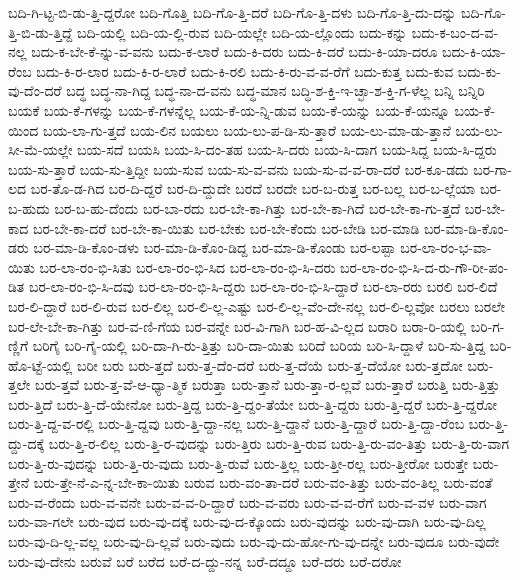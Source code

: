 {ಬದಿ-ಗಿ-ಟ್ಟ-ಬಿ-ಡು-ತ್ತಿ-ದ್ದರೋ
ಬದಿ-ಗೊತ್ತಿ
ಬದಿ-ಗೊ-ತ್ತಿ-ದರೆ
ಬದಿ-ಗೊ-ತ್ತಿ-ದಳು
ಬದಿ-ಗೊ-ತ್ತಿ-ದು-ದನ್ನು
ಬದಿ-ಗೊ-ತ್ತಿ-ಬಿ-ಡು-ತ್ತಿದ್ದೆ
ಬದಿ-ಯಲ್ಲಿ
ಬದಿ-ಯ-ಲ್ಲಿ-ರುವ
ಬದಿ-ಯಲ್ಲೇ
ಬದಿ-ಯ-ಲ್ಲೊಂದು
ಬದು-ಕನ್ನು
ಬದು-ಕ-ಬಂ-ದ-ವ-ನಲ್ಲ
ಬದು-ಕ-ಬೇ-ಕೆ-ನ್ನು-ವ-ವನು
ಬದು-ಕ-ಲಾರೆ
ಬದು-ಕಿ-ದರು
ಬದು-ಕಿ-ದರೆ
ಬದು-ಕಿ-ಯಾ-ದರೂ
ಬದು-ಕಿ-ಯಾ-ರೆಂಬ
ಬದು-ಕಿ-ರ-ಲಾರ
ಬದು-ಕಿ-ರ-ಲಾರೆ
ಬದು-ಕಿ-ರಲಿ
ಬದು-ಕಿ-ರು-ವ-ವ-ರೆಗೆ
ಬದು-ಕುತ್ತ
ಬದು-ಕುವ
ಬದು-ಕು-ವು-ದೆಂ-ದರೆ
ಬದ್ಧ
ಬದ್ಧ-ನಾ-ಗಿದ್ದ
ಬದ್ಧ-ನಾ-ದ-ವನು
ಬದ್ಧ-ಮಾನ
ಬದ್ಧಿ-ಶ-ಕ್ತಿ-ಇ-ಚ್ಛಾ-ಶ-ಕ್ತಿ-ಗ-ಳೆಲ್ಲ
ಬನ್ನಿ
ಬನ್ನಿರಿ
ಬಯಕೆ
ಬಯ-ಕೆ-ಗಳನ್ನು
ಬಯ-ಕೆ-ಗಳನ್ನೆಲ್ಲ
ಬಯ-ಕೆ-ಯ-ನ್ನಿ-ಡುವ
ಬಯ-ಕೆ-ಯನ್ನು
ಬಯ-ಕೆ-ಯನ್ನೂ
ಬಯ-ಕೆ-ಯಿಂದ
ಬಯ-ಲಾ-ಗು-ತ್ತದೆ
ಬಯ-ಲಿನ
ಬಯಲು
ಬಯ-ಲು-ಪ-ಡಿ-ಸು-ತ್ತಾರೆ
ಬಯ-ಲು-ಮಾ-ಡು-ತ್ತಾನೆ
ಬಯ-ಲು-ಸೀ-ಮೆ-ಯಲ್ಲೇ
ಬಯ-ಸದೆ
ಬಯಸಿ
ಬಯ-ಸಿ-ದಂ-ತಹ
ಬಯ-ಸಿ-ದರು
ಬಯ-ಸಿ-ದಾಗ
ಬಯ-ಸಿದ್ದ
ಬಯ-ಸಿ-ದ್ದರು
ಬಯ-ಸು-ತ್ತಾರೆ
ಬಯ-ಸು-ತ್ತಿದ್ದೀ
ಬಯ-ಸುವ
ಬಯ-ಸು-ವ-ವನು
ಬಯ-ಸು-ವ-ವ-ರಾ-ದರೆ
ಬರ-ಕೂ-ಡದು
ಬರ-ಗಾ-ಲದ
ಬರ-ತೊ-ಡ-ಗಿದ
ಬರ-ದಿ-ದ್ದರೆ
ಬರ-ದಿ-ದ್ದುದೇ
ಬರದೆ
ಬರದೇ
ಬರ-ಬ-ರುತ್ತ
ಬರ-ಬಲ್ಲ
ಬರ-ಬ-ಲ್ಲೆಯಾ
ಬರ-ಬ-ಹುದು
ಬರ-ಬ-ಹು-ದೆಂದು
ಬರ-ಬಾ-ರದು
ಬರ-ಬೇ-ಕಾ-ಗಿತ್ತು
ಬರ-ಬೇ-ಕಾ-ಗಿದೆ
ಬರ-ಬೇ-ಕಾ-ಗು-ತ್ತದೆ
ಬರ-ಬೇ-ಕಾದ
ಬರ-ಬೇ-ಕಾ-ದರೆ
ಬರ-ಬೇ-ಕಾ-ಯಿತು
ಬರ-ಬೇಕು
ಬರ-ಬೇ-ಕೆಂದು
ಬರ-ಬೇಡಿ
ಬರ-ಮಾಡಿ
ಬರ-ಮಾ-ಡಿ-ಕೊಂ-ಡರು
ಬರ-ಮಾ-ಡಿ-ಕೊಂ-ಡಳು
ಬರ-ಮಾ-ಡಿ-ಕೊಂ-ಡಿದ್ದ
ಬರ-ಮಾ-ಡಿ-ಕೊಂಡು
ಬರ-ಲಪ್ಪಾ
ಬರ-ಲಾ-ರಂ-ಭ-ವಾ-ಯಿತು
ಬರ-ಲಾ-ರಂ-ಭಿ-ಸಿತು
ಬರ-ಲಾ-ರಂ-ಭಿ-ಸಿದ
ಬರ-ಲಾ-ರಂ-ಭಿ-ಸಿ-ದರು
ಬರ-ಲಾ-ರಂ-ಭಿ-ಸಿ-ದ-ರು-ಗೌ-ರೀ-ಪಂ-ಡಿತ
ಬರ-ಲಾ-ರಂ-ಭಿ-ಸಿ-ದವು
ಬರ-ಲಾ-ರಂ-ಭಿ-ಸಿ-ದ್ದರು
ಬರ-ಲಾ-ರಂ-ಭಿ-ಸಿ-ದ್ದಾರೆ
ಬರ-ಲಾ-ರರು
ಬರಲಿ
ಬರ-ಲಿದೆ
ಬರ-ಲಿ-ದ್ದಾರೆ
ಬರ-ಲಿ-ರುವ
ಬರ-ಲಿಲ್ಲ
ಬರ-ಲಿ-ಲ್ಲ-ಎಷ್ಟು
ಬರ-ಲಿ-ಲ್ಲ-ವೆಂ-ದೇ-ನಲ್ಲ
ಬರ-ಲಿ-ಲ್ಲವೋ
ಬರಲು
ಬರಲೇ
ಬರ-ಲೇ-ಬೇ-ಕಾ-ಗಿತ್ತು
ಬರ-ವ-ಣಿ-ಗೆಯ
ಬರ-ವನ್ನೇ
ಬರ-ವಿ-ಗಾಗಿ
ಬರ-ಹ-ವಿ-ಲ್ಲದ
ಬರಾರಿ
ಬರಾ-ರಿ-ಯಲ್ಲಿ
ಬರಿ-ಗ-ಣ್ಣಿಗೆ
ಬರಿಗೈ
ಬರಿ-ಗೈ-ಯಲ್ಲಿ
ಬರಿ-ದಾ-ಗಿ-ರು-ತ್ತಿತ್ತು
ಬರಿ-ದಾ-ಯಿತು
ಬರಿದೆ
ಬರಿಯ
ಬರಿ-ಸಿ-ದ್ದಾಳೆ
ಬರಿ-ಸು-ತ್ತಿದ್ದ
ಬರಿ-ಹೊ-ಟ್ಟೆ-ಯಲ್ಲಿ
ಬರೀ
ಬರು
ಬರು-ತ್ತದೆ
ಬರು-ತ್ತ-ದೆಂ-ದರೆ
ಬರು-ತ್ತ-ದೆಯೆ
ಬರು-ತ್ತ-ದೆಯೋ
ಬರು-ತ್ತದೋ
ಬರು-ತ್ತಲೇ
ಬರು-ತ್ತವೆ
ಬರು-ತ್ತ-ವೆ-ಆ-ಧ್ಯಾ-ತ್ಮಿಕ
ಬರುತ್ತಾ
ಬರು-ತ್ತಾನೆ
ಬರು-ತ್ತಾ-ರ-ಲ್ಲವೆ
ಬರು-ತ್ತಾರೆ
ಬರುತ್ತಿ
ಬರು-ತ್ತಿತ್ತು
ಬರು-ತ್ತಿದೆ
ಬರು-ತ್ತಿ-ದೆ-ಯೇನೋ
ಬರು-ತ್ತಿದ್ದ
ಬರು-ತ್ತಿ-ದ್ದಂ-ತೆಯೇ
ಬರು-ತ್ತಿ-ದ್ದರು
ಬರು-ತ್ತಿ-ದ್ದರೆ
ಬರು-ತ್ತಿ-ದ್ದರೋ
ಬರು-ತ್ತಿ-ದ್ದ-ವ-ರಲ್ಲಿ
ಬರು-ತ್ತಿ-ದ್ದವು
ಬರು-ತ್ತಿ-ದ್ದಾ-ನಲ್ಲ
ಬರು-ತ್ತಿ-ದ್ದಾನೆ
ಬರು-ತ್ತಿ-ದ್ದಾರೆ
ಬರು-ತ್ತಿ-ದ್ದಾ-ರೆಂಬ
ಬರು-ತ್ತಿ-ದ್ದು-ದಕ್ಕೆ
ಬರು-ತ್ತಿ-ರ-ಲಿಲ್ಲ
ಬರು-ತ್ತಿ-ರ-ವುದನ್ನು
ಬರು-ತ್ತಿರು
ಬರು-ತ್ತಿ-ರುವ
ಬರು-ತ್ತಿ-ರು-ವಂ-ತಿತ್ತು
ಬರು-ತ್ತಿ-ರು-ವಾಗ
ಬರು-ತ್ತಿ-ರು-ವುದನ್ನು
ಬರು-ತ್ತಿ-ರು-ವುದು
ಬರು-ತ್ತಿ-ರುವೆ
ಬರು-ತ್ತಿಲ್ಲ
ಬರು-ತ್ತೀ-ರಲ್ಲ
ಬರು-ತ್ತೀರೋ
ಬರುತ್ತೇ
ಬರು-ತ್ತೇನೆ
ಬರು-ತ್ತೇ-ನೆ-ಎ-ನ್ನ-ಬೇ-ಕಾ-ಯಿತು
ಬರುವ
ಬರು-ವಂ-ತಾ-ದರೆ
ಬರು-ವಂ-ತಿತ್ತು
ಬರು-ವಂ-ತಿಲ್ಲ
ಬರು-ವಂತೆ
ಬರು-ವ-ರೆಂದು
ಬರು-ವ-ವನೇ
ಬರು-ವ-ವ-ರಿ-ದ್ದಾರೆ
ಬರು-ವ-ವರು
ಬರು-ವ-ವ-ರೆಗೆ
ಬರು-ವ-ವಳ
ಬರು-ವಾಗ
ಬರು-ವಾ-ಗಲೇ
ಬರು-ವುದ
ಬರು-ವು-ದಕ್ಕೆ
ಬರು-ವು-ದ-ಕ್ಕೊಂದು
ಬರು-ವುದನ್ನು
ಬರು-ವು-ದಾಗಿ
ಬರು-ವು-ದಿಲ್ಲ
ಬರು-ವು-ದಿ-ಲ್ಲ-ವಲ್ಲ
ಬರು-ವು-ದಿ-ಲ್ಲವೆ
ಬರು-ವುದು
ಬರು-ವು-ದು-ಹೋ-ಗು-ವು-ದನ್ನೇ
ಬರು-ವುದೂ
ಬರು-ವುದೇ
ಬರು-ವು-ದೇನು
ಬರುವೆ
ಬರೆ
ಬರೆದ
ಬರೆ-ದ-ದ್ದು-ನನ್ನ
ಬರೆ-ದದ್ದೂ
ಬರೆ-ದರು
ಬರೆ-ದರೋ
}
